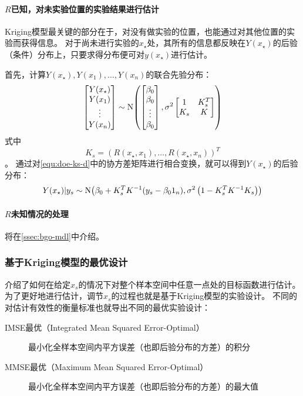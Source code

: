 \documentclass[index]{subfiles}
\begin{document}
\paragraph{$R$已知，对未实验位置的实验结果进行估计}
Kriging模型最关键的部分在于，对没有做实验的位置，也能通过对其他位置的实验而获得信息。
对于尚未进行实验的$x_\star$处，其所有的信息都反映在$Y(x_\star)$的后验（条件）分布上，只要求得分布便可对$y(x_\star)$进行估计。

首先，计算$Y(x_\star),Y(x_1),\ldots,Y(x_n)$的联合先验分布：
\begin{equation}\label{equ:doe-ks-d}
  \begin{bmatrix} Y(x_\star) \\ Y(x_1) \\ \vdots \\ Y(x_n) \end{bmatrix}
  \sim \Normal{
    \begin{bmatrix} \beta_0 \\ \beta_0 \\ \vdots \\ \beta_0 \end{bmatrix}
  }{\sigma^2
    \begin{bmatrix}
      1 & K_s^T \\
      K_s & K
    \end{bmatrix}
  }
\end{equation}
式中
\begin{equation}\label{equ:doe-ks}
  K_s = \left(R(x_\star, x_1), \ldots, R(x_\star, x_n)\right)^T
\end{equation}
。
通过对\cref{equ:doe-ks-d}中的协方差矩阵进行相合变换\cite{rasmussen2004}，就可以得到$Y(x_\star)$的后验分布：
\begin{equation}\label{equ:doe-y}
  Y(x_\star)|y_s \sim \Normal{\beta_0 + K_s^T K^{-1} (y_s - \beta_0 \one_n)}{\sigma^2 \left(1 - K_s^T K^{-1} K_s\right)}
\end{equation}

\paragraph{$R$未知情况的处理} 将在\cref{ssec:bgo-mdl}中介绍。

\subsubsection{基于Kriging模型的最优设计}\label{sssec:doe-k-o}
介绍了如何在给定$x_s$的情况下对整个样本空间中任意一点处的目标函数进行估计。
为了更好地进行估计，调节$x_s$的过程也就是基于Kriging模型的实验设计\cite{pronzato2012}。
不同的对估计有效性的衡量标准也就导出不同的最优实验设计：
\begin{description}
  \item[IMSE最优（Integrated Mean Squared Error-Optimal）]\cite{sacks1989} 最小化全样本空间内平方误差（也即后验分布的方差）的积分
  \item[MMSE最优（Maximum Mean Squared Error-Optimal）]\cite{sacks1989} 最小化全样本空间内平方误差（也即后验分布的方差）的最大值
\end{description}
\end{document}
